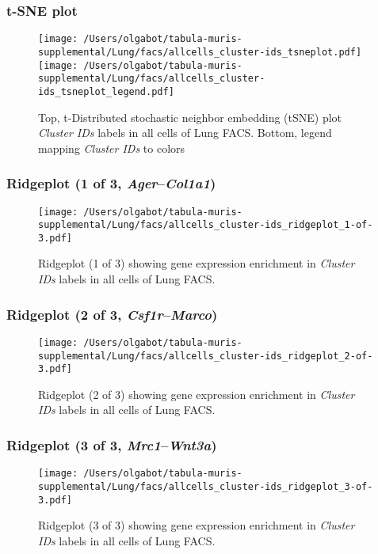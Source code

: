 \clearpage
\subsubsection{t-SNE plot}
\begin{figure}[h]
\centering
\texttt{[image: /Users/olgabot/tabula-muris-supplemental/Lung/facs/allcells\_cluster-ids\_tsneplot.pdf]}
\texttt{[image: /Users/olgabot/tabula-muris-supplemental/Lung/facs/allcells\_cluster-ids\_tsneplot\_legend.pdf]}
\caption{Top, t-Distributed stochastic neighbor embedding (tSNE) plot  \emph{Cluster IDs} labels in all cells of Lung FACS. Bottom, legend mapping \emph{Cluster IDs} to colors}
\end{figure}


\clearpage

\subsubsection{Ridgeplot (1 of 3, \emph{Ager}--\emph{Col1a1})}
\begin{figure}[h]
\centering
\texttt{[image: /Users/olgabot/tabula-muris-supplemental/Lung/facs/allcells\_cluster-ids\_ridgeplot\_1-of-3.pdf]}

\caption{ Ridgeplot (1 of 3)  showing gene expression enrichment in \emph{Cluster IDs} labels in all cells of Lung FACS. }
\end{figure}


\clearpage

\subsubsection{Ridgeplot (2 of 3, \emph{Csf1r}--\emph{Marco})}
\begin{figure}[h]
\centering
\texttt{[image: /Users/olgabot/tabula-muris-supplemental/Lung/facs/allcells\_cluster-ids\_ridgeplot\_2-of-3.pdf]}

\caption{ Ridgeplot (2 of 3)  showing gene expression enrichment in \emph{Cluster IDs} labels in all cells of Lung FACS. }
\end{figure}


\clearpage

\subsubsection{Ridgeplot (3 of 3, \emph{Mrc1}--\emph{Wnt3a})}
\begin{figure}[h]
\centering
\texttt{[image: /Users/olgabot/tabula-muris-supplemental/Lung/facs/allcells\_cluster-ids\_ridgeplot\_3-of-3.pdf]}

\caption{ Ridgeplot (3 of 3)  showing gene expression enrichment in \emph{Cluster IDs} labels in all cells of Lung FACS. }
\end{figure}


